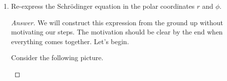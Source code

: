 \documentclass[../psets.tex]{subfiles}
\begin{document}
\begin{enumerate}
\begin{enumerate}
\begin{proof}[Answer]
        \end{proof}
        \item Re-express the Schr\"{o}dinger equation in the polar coordinates $r$ and $\phi$.
        \begin{proof}[Answer]
            We will construct this expression from the ground up without motivating our steps. The motivation should be clear by the end when everything comes together. Let's begin.\par
            Consider the following picture.
            \begin{center}
\end{center}
\end{proof}
\end{enumerate}
\end{enumerate}
\end{document}
